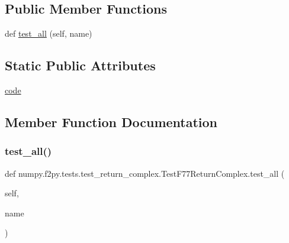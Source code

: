 \subsection*{Public Member Functions}
\begin{DoxyCompactItemize}
\item 
def \hyperlink{classnumpy_1_1f2py_1_1tests_1_1test__return__complex_1_1TestF77ReturnComplex_a93477e32717c1ef8e82be532fee9f803}{test\+\_\+all} (self, name)
\end{DoxyCompactItemize}
\subsection*{Static Public Attributes}
\begin{DoxyCompactItemize}
\item 
\hyperlink{classnumpy_1_1f2py_1_1tests_1_1test__return__complex_1_1TestF77ReturnComplex_a031ae27b687a0d87ec145befd32c0851}{code}
\end{DoxyCompactItemize}


\subsection{Member Function Documentation}
\mbox{\label{classnumpy_1_1f2py_1_1tests_1_1test__return__complex_1_1TestF77ReturnComplex_a93477e32717c1ef8e82be532fee9f803}} 
\subsubsection{\texorpdfstring{test\+\_\+all()}{test\_all()}}
{\footnotesize\ttfamily def numpy.\+f2py.\+tests.\+test\+\_\+return\+\_\+complex.\+Test\+F77\+Return\+Complex.\+test\+\_\+all (\begin{DoxyParamCaption}\item[{}]{self,  }\item[{}]{name }\end{DoxyParamCaption})}



